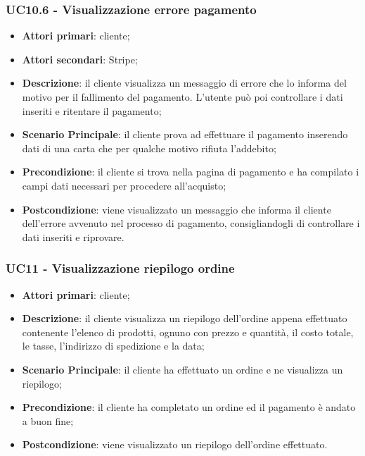 \subsubsection{UC10.6 - Visualizzazione errore pagamento}
\begin{itemize}
\item \textbf{Attori primari}: cliente;
\item \textbf{Attori secondari}: Stripe;
\item \textbf{Descrizione}: il cliente visualizza un messaggio di errore che lo informa del motivo per il fallimento del pagamento. L'utente può poi controllare i dati inseriti e ritentare il pagamento;
\item \textbf{Scenario Principale}: il cliente prova ad effettuare il pagamento inserendo dati di una carta che per qualche motivo rifiuta l'addebito;
\item \textbf{Precondizione}: il cliente si trova nella pagina di pagamento e ha compilato i campi dati necessari per procedere all'acquisto;
\item \textbf{Postcondizione}: viene visualizzato un messaggio che informa il cliente dell'errore avvenuto nel processo di pagamento, consigliandogli di controllare i dati inseriti e riprovare.
\end{itemize}


\subsubsection{UC11 - Visualizzazione riepilogo ordine}
\begin{itemize}
\item \textbf{Attori primari}: cliente;
\item \textbf{Descrizione}: il cliente visualizza un riepilogo dell'ordine appena effettuato contenente l'elenco di prodotti, ognuno con prezzo e quantità, il costo totale, le tasse, l'indirizzo di spedizione e la data;
\item \textbf{Scenario Principale}: il cliente ha effettuato un ordine e ne visualizza un riepilogo;
\item \textbf{Precondizione}: il cliente ha completato un ordine ed il pagamento è andato a buon fine;
\item \textbf{Postcondizione}: viene visualizzato un riepilogo dell'ordine effettuato.
\end{itemize}
